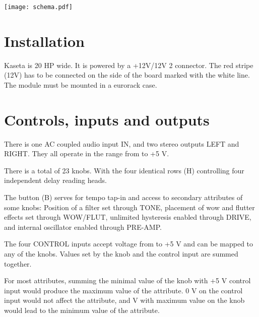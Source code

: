 \documentclass[11pt]{article}
\begin{document}
\begin{minipage}{0.6\textwidth}
\vspace{8mm}

\begin{center}
  \texttt{[image: schema.pdf]}
\end{center}

\end{minipage}

\newpage
\color{black}

\begin{minipage}[t]{0.45\textwidth}
\setlength{\parskip}{6pt}

\section{Installation}

Kaseta is 20 HP wide. It is powered by a +12V/{\textminus}12V 2
connector. The red stripe (\textminus12V) has to be connected on the side of the
board marked with the white line. The module must be mounted in a eurorack case.

\vspace{0.5cm}

\section{Controls, inputs and outputs}

There is one AC coupled audio input IN, and two stereo outputs LEFT and RIGHT.
They all operate in the range from  to +5 V.

There is a total of 23 knobs. With the four identical rows (H) controlling four
independent delay reading heads.

The button (B) serves for tempo tap-in and access to secondary attributes of
some knobs:
Position of a filter set through TONE,
placement of wow and flutter effects set through WOW/FLUT,
unlimited hysteresis enabled through DRIVE,
and internal oscillator enabled through PRE-AMP.

The four CONTROL inputs accept voltage from  to +5 V and can be
mapped to any of the knobs. Values set by the knob and the control input are
summed together.

For most attributes, summing the minimal value of the knob with +5 V control
input would produce the maximum value of the attribute. 0 V on the control input
would not affect the attribute, and  V with maximum value on the knob
would lead to the minimum value of the attribute.


\end{minipage}
\end{document}
